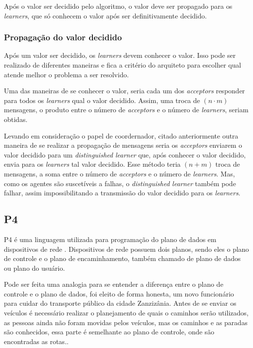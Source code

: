\documentclass[12pt,
openright, 
oneside,
a4paper,
brazil]{facom-ufu-abntex2}
\theoremstyle{definition}
\begin{document}
Após o valor ser decidido pelo algoritmo, o valor deve ser propagado para os \textit{learners},
que só conhecem o valor após ser definitivamente decidido.

\subsubsection{Propagação do valor decidido}
Após um valor ser decidido, os \textit{learners} devem conhecer o valor. Isso pode ser realizado
de diferentes maneiras e fica a critério do arquiteto para escolher qual atende melhor o
problema a ser resolvido.

Uma das maneiras de se conhecer o valor, seria cada um dos \textit{acceptors} responder para
todos os \textit{learners} qual o valor decidido. Assim, uma troca de $(n \cdot m)$ mensagens, 
o produto entre o número de \textit{acceptors} e o número de \textit{learners}, seriam obtidas.

Levando em consideração o papel de coordernador, citado anteriormente outra maneira de se 
realizar a propagação de mensagens seria os \textit{acceptors} enviarem o valor decidido para um
\textit{distinguished learner} que, após conhecer o valor decidido, envia para os
\textit{learners} tal valor decidido. Esse método teria $(n + m)$ troca de mensagens,
a soma entre o número de \textit{acceptors} e o número de \textit{learners}. Mas, como os
agentes são suscetíveis a falhas, o \textit{distinguished learner} também pode falhar,
assim impossibilitando a transmissão do valor decidido para os \textit{learners}.

\subsection{P4}
P4 é uma linguagem utilizada para programação do plano de dados em  dispositivos de 
rede \citep{paxos16spec}. Dispositivos de rede possuem dois planos, sendo eles o 
plano de controle e o plano de encaminhamento, também chamado de plano de dados ou 
plano do usuário. 

Pode ser feita uma analogia para se entender a diferença entre o 
plano de controle e o plano de dados, foi eleito de forma honesta, um novo 
funcionário para cuidar do transporte público da cidade Zanzizânia. Antes de se 
enviar os veículos é necessário realizar o planejamento de quais o caminhos serão
utilizados, as pessoas ainda não foram movidas pelos veículos, mas os caminhos 
e as paradas são conhecidos, essa parte é semelhante ao plano de controle, onde 
são encontradas as rotas.\citep{dataVsControl}.
\end{document}
